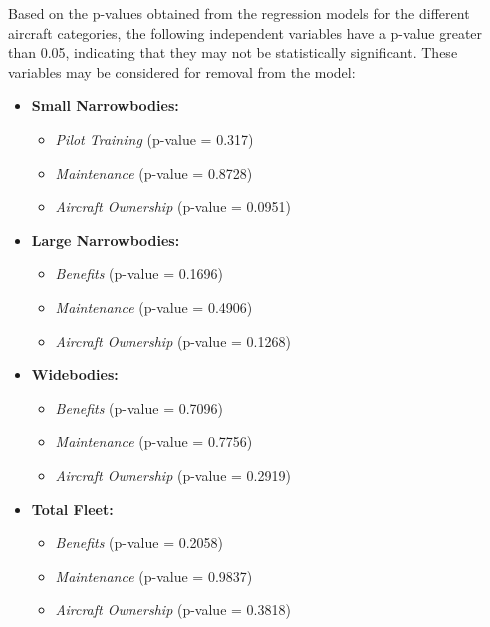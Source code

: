 Based on the p-values obtained from the regression models for the different aircraft categories, the following independent variables have a p-value greater than 0.05, indicating that they may not be statistically significant. These variables may be considered for removal from the model:

\begin{itemize}
    \item \textbf{Small Narrowbodies:}
          \begin{itemize}
              \item \textit{Pilot Training} (p-value =  0.317)
              \item \textit{Maintenance} (p-value = 0.8728)
              \item \textit{Aircraft Ownership} (p-value = 0.0951)
          \end{itemize}

    \item \textbf{Large Narrowbodies:}
          \begin{itemize}
              \item \textit{Benefits} (p-value = 0.1696)
              \item \textit{Maintenance} (p-value = 0.4906)
              \item \textit{Aircraft Ownership} (p-value = 0.1268)
          \end{itemize}

    \item \textbf{Widebodies:}
          \begin{itemize}
              \item \textit{Benefits} (p-value = 0.7096)
              \item \textit{Maintenance} (p-value = 0.7756)
              \item \textit{Aircraft Ownership} (p-value = 0.2919)
          \end{itemize}

    \item \textbf{Total Fleet:}
          \begin{itemize}
              \item \textit{Benefits} (p-value = 0.2058)
              \item \textit{Maintenance} (p-value = 0.9837)
              \item \textit{Aircraft Ownership} (p-value = 0.3818)
          \end{itemize}
\end{itemize}